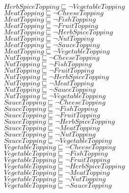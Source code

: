 \documentclass[a4paper,10pt]{article}
\begin{document}
 $HerbSpiceTopping \sqsubseteq  \lnot VegetableTopping$\\ 
 $MeatTopping \sqsubseteq  \lnot CheeseTopping$\\ 
 $MeatTopping \sqsubseteq  \lnot FishTopping$\\ 
 $MeatTopping \sqsubseteq  \lnot FruitTopping$\\ 
 $MeatTopping \sqsubseteq  \lnot HerbSpiceTopping$\\ 
 $MeatTopping \sqsubseteq  \lnot NutTopping$\\ 
 $MeatTopping \sqsubseteq  \lnot SauceTopping$\\ 
 $MeatTopping \sqsubseteq  \lnot VegetableTopping$\\ 
 $NutTopping \sqsubseteq  \lnot CheeseTopping$\\ 
 $NutTopping \sqsubseteq  \lnot FishTopping$\\ 
 $NutTopping \sqsubseteq  \lnot FruitTopping$\\ 
 $NutTopping \sqsubseteq  \lnot HerbSpiceTopping$\\ 
 $NutTopping \sqsubseteq  \lnot MeatTopping$\\ 
 $NutTopping \sqsubseteq  \lnot SauceTopping$\\ 
 $NutTopping \sqsubseteq  \lnot VegetableTopping$\\ 
 $SauceTopping \sqsubseteq  \lnot CheeseTopping$\\ 
 $SauceTopping \sqsubseteq  \lnot FishTopping$\\ 
 $SauceTopping \sqsubseteq  \lnot FruitTopping$\\ 
 $SauceTopping \sqsubseteq  \lnot HerbSpiceTopping$\\ 
 $SauceTopping \sqsubseteq  \lnot MeatTopping$\\ 
 $SauceTopping \sqsubseteq  \lnot NutTopping$\\ 
 $SauceTopping \sqsubseteq  \lnot VegetableTopping$\\ 
 $VegetableTopping \sqsubseteq  \lnot CheeseTopping$\\ 
 $VegetableTopping \sqsubseteq  \lnot FishTopping$\\ 
 $VegetableTopping \sqsubseteq  \lnot FruitTopping$\\ 
 $VegetableTopping \sqsubseteq  \lnot HerbSpiceTopping$\\ 
 $VegetableTopping \sqsubseteq  \lnot MeatTopping$\\ 
 $VegetableTopping \sqsubseteq  \lnot NutTopping$\\ 
 $VegetableTopping \sqsubseteq  \lnot SauceTopping$\\ 
\end{document}
